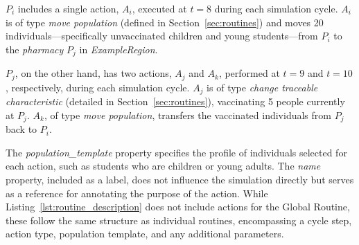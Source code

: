 \documentclass[pdflatex,sn-mathphys-num]{sn-jnl}%
\theoremstyle{thmstyleone}%
\theoremstyle{thmstyletwo}%
\theoremstyle{thmstylethree}%
\begin{document}
\begin{appendices}
$P_i$ includes a single action, $A_i$, executed at $t = 8$ during each simulation cycle. $A_i$ is of type \textit{move population} (defined in Section~\ref{sec:routines}) and moves 20 individuals—specifically unvaccinated children and young students—from $P_i$ to the \textit{pharmacy} $P_j$ in \textit{ExampleRegion}.

$P_j$, on the other hand, has two actions, $A_j$ and $A_k$, performed at $t = 9$ and $t = 10$, respectively, during each simulation cycle. $A_j$ is of type \textit{change traceable characteristic} (detailed in Section~\ref{sec:routines}), vaccinating 5 people currently at $P_j$. $A_k$, of type \textit{move population}, transfers the vaccinated individuals from $P_j$ back to $P_i$.

The \textit{population\_template} property specifies the profile of individuals selected for each action, such as students who are children or young adults. The \textit{name} property, included as a label, does not influence the simulation directly but serves as a reference for annotating the purpose of the action.
While Listing~\ref{lst:routine_description} does not include actions for the Global Routine, these follow the same structure as individual routines, encompassing a cycle step, action type, population template, and any additional parameters.



\end{appendices}
\end{document}
